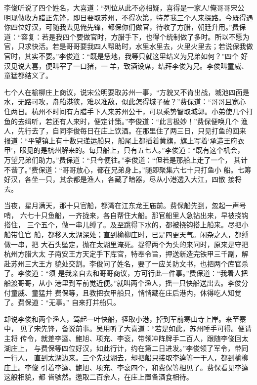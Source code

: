 李俊听说了四个姓名，大喜道：“列位从此不必相疑，喜得是一家人!俺哥哥宋公
明现做收方腊正先锋，即日要取苏州，不得次第，特差我三个人来探路。今既得遇
你四位好汉，可随我去见俺先锋，都保你们做官，待收了方腊，朝廷升用。”费保
道：“容复：若是我四个要做官时，方腊手下，也得个统制做了多时。所以不愿为
官，只求快活。若是哥哥要我四人帮助时，水里水里去，火里火里去；若说保我做
官时，其实不要。”李俊道：“既是恁地，我等只就这里结义为兄弟如何？”四个
好汉见说大喜，便叫宰了一口猪，一羊，致酒设席，结拜李俊为兄。李俊叫童威、
童猛都结义了。

七个人在榆柳庄上商议，说宋公明要取苏州一事，“方貌又不肯出战，城池四面是
水，无路可攻，舟船港狭，难以准敌，似此怎得城子破？”费保道：“哥哥且宽心
住两日。杭州不时间有方腊手下人来苏州公干，可以乘势智取城郭。小弟使几个打
鱼的去缉听，若还有人来时，便定计策。”李俊道：“此言极妙！”费保便唤几个
渔人，先行去了，自同李俊每日在庄上饮酒。在那里住了两三日，只见打鱼的回来
报道：“平望镇上有十数只递运船只，船尾上都插着黄旗，旗上写着‘承造王府衣
甲’，眼见的是杭州解来的。每只船上，只有五七人。”李俊道：“既有这个机会，
万望兄弟们助力。”费保道：“只今便往。”李俊道：“但若是那船上走了一个，
其计不谐了。”费保道：“哥哥放心，都在兄弟身上。”随即聚集六七十只打鱼小
船。七筹好汉，各坐一只，其余都是渔人，各藏了暗器，尽从小港透入大江，四散
接将去。

当夜，星月满天，那十只官船，都湾在江东龙王庙前。费保船先到，忽起一声号哨，
六七十只鱼船，一齐拢来，各自帮住大船。那官船里人急钻出来，早被挠钩搭住，
三个五个，做一串儿缚了。及至跳得下水的，都被挠钩搭上船来。尽把小船带住官
船，都移入太湖深处；直到榆柳庄时，已是四更天气。闲杂之人，都缚做一串，把
大石头坠定，抛在太湖里淹死。捉得两个为头的来问时，原来是守把杭州方腊大太
子南安王方天定手下库官，特奉令旨，押送新造完铁甲三千副，解赴苏州三大王方
貌处交割。李俊问了姓名，要了一应关防文书，也把两个库官杀了。李俊道：“须
是我亲自去和哥哥商议，方可行此一件事。”费保道：“我着人把船渡哥哥，从小
港里到军前觉近便。”就叫两个渔人，摇一只快船送出去。李俊分付童威、童猛并
费保等，且教把衣甲船只，悄悄藏在庄后港内，休得吃人知觉了。费保道：“无事。”
自来打并船只。

却说李俊和两个渔人，驾起一叶快船，径取小港，掉到军前寒山寺上岸。来至寨中，
见了宋先锋，备说前事。吴用听了大喜道：“若是如此，苏州唾手可得。便请主将
传令，就差李逵、鲍旭、项充、李衮，带领冲阵牌手二百人，跟随李俊回太湖庄上，
与费保等四位好汉，如此行计，约在第二日进发。”李俊领了军令，带同一行人，
直到太湖边来。三个先过湖去，却把船只接取李逵等一干人，都到榆柳庄上。李俊
引着李逵、鲍旭、项充、李衮四个，和费保等相见了。费保看见李逵这般相貌，都
皆骇然。邀取二百余人，在庄上置备酒食相待。

